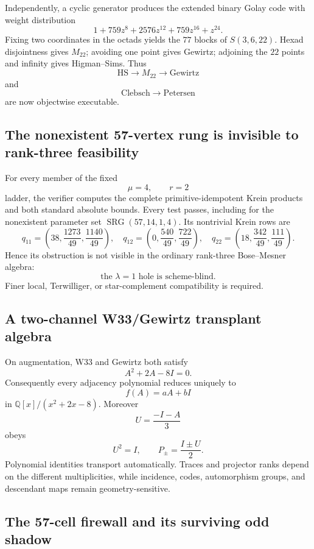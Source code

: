 Independently, a cyclic generator produces the extended binary Golay code with
weight distribution
\[
1+759z^8+2576z^{12}+759z^{16}+z^{24}.
\]
Fixing two coordinates in the octads yields the \(77\) blocks of
\(S(3,6,22)\).  Hexad disjointness gives \(M_{22}\); avoiding one point gives
Gewirtz; adjoining the \(22\) points and infinity gives Higman--Sims.  Thus
\[
\boxed{\mathrm{HS}\longrightarrow M_{22}\longrightarrow\mathrm{Gewirtz}}
\]
and
\[
\boxed{\mathrm{Clebsch}\longrightarrow\mathrm{Petersen}}
\]
are now objectwise executable.

\subsection{The nonexistent 57-vertex rung is invisible to rank-three feasibility}

For every member of the fixed
\[
\mu=4,\qquad r=2
\]
ladder, the verifier computes the complete primitive-idempotent Krein products
and both standard absolute bounds.  Every test passes, including for the
nonexistent parameter set \(\operatorname{SRG}(57,14,1,4)\).  Its nontrivial
Krein rows are
\[
q_{11}=\left(38,\frac{1273}{49},\frac{1140}{49}\right),
\quad
q_{12}=\left(0,\frac{540}{49},\frac{722}{49}\right),
\quad
q_{22}=\left(18,\frac{342}{49},\frac{111}{49}\right).
\]
Hence its obstruction is not visible in the ordinary rank-three
Bose--Mesner algebra:
\[
\boxed{\text{the }\lambda=1\text{ hole is scheme-blind}.}
\]
Finer local, Terwilliger, or star-complement compatibility is required.

\subsection{A two-channel W33/Gewirtz transplant algebra}

On augmentation, W33 and Gewirtz both satisfy
\[
A^2+2A-8I=0.
\]
Consequently every adjacency polynomial reduces uniquely to
\[
f(A)=aA+bI
\]
in \(\mathbb Q[x]/(x^2+2x-8)\).  Moreover
\[
U=\frac{-I-A}{3}
\]
obeys
\[
U^2=I,
\qquad
P_\pm=\frac{I\pm U}{2}.
\]
Polynomial identities transport automatically.  Traces and projector ranks
depend on the different multiplicities, while incidence, codes, automorphism
groups, and descendant maps remain geometry-sensitive.

\subsection{The 57-cell firewall and its surviving odd shadow}

